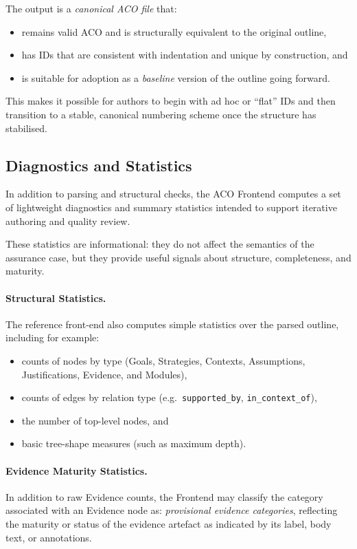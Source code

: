 \documentclass[11pt,twoside,a4paper]{article}
\begin{document}
The output is a \emph{canonical ACO file} that:
\begin{itemize}[leftmargin=2em]
  \item remains valid ACO and is structurally equivalent to the original outline,
  \item has IDs that are consistent with indentation and unique by construction, and
  \item is suitable for adoption as a \emph{baseline} version of the outline going forward.
\end{itemize}

This makes it possible for authors to begin with ad hoc or ``flat'' IDs and then transition to a stable, canonical numbering scheme once the structure has stabilised.

\subsection{Diagnostics and Statistics}
\label{sec:diagnostics}

In addition to parsing and structural checks, the ACO Frontend computes a set of
lightweight diagnostics and summary statistics intended to support iterative
authoring and quality review.

These statistics are informational: they do not affect the semantics of the
assurance case, but they provide useful signals about structure, completeness,
and maturity.

\paragraph{Structural Statistics.}
The reference front-end also computes simple statistics over the parsed outline,
including for example:
\begin{itemize}[leftmargin=2em]
  \item counts of nodes by type (Goals, Strategies, Contexts, Assumptions,
        Justifications, Evidence, and Modules),
  \item counts of edges by relation type (e.g.\ \texttt{supported\_by},
        \texttt{in\_context\_of}),
  \item the number of top-level nodes, and
  \item basic tree-shape measures (such as maximum depth).
\end{itemize}

\paragraph{Evidence Maturity Statistics.}
In addition to raw Evidence counts, the Frontend may classify the category associated with an Evidence node as:
\emph{provisional evidence categories}, reflecting the maturity or status of the
evidence artefact as indicated by its label, body text, or annotations.
\end{document}
